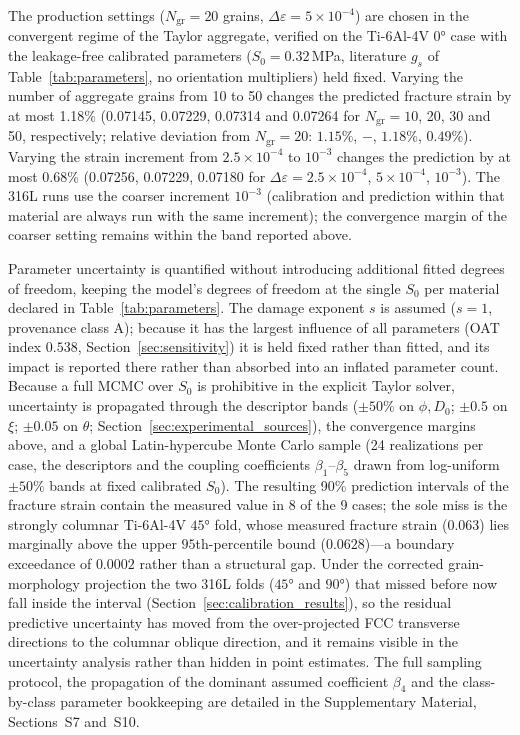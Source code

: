 \documentclass[12pt,a4paper,twocolumn]{article}
\begin{document}
The production settings ($N_{\mathrm{gr}}=20$ grains, $\Delta\varepsilon = 5\times10^{-4}$) are chosen in the convergent regime of the Taylor aggregate, verified on the Ti-6Al-4V $\ang{0}$ case with the leakage-free calibrated parameters ($S_0=0.32$\,MPa, literature $g_s$ of Table~\ref{tab:parameters}, no orientation multipliers) held fixed. Varying the number of aggregate grains from 10 to 50 changes the predicted fracture strain by at most 1.18\% (0.07145, 0.07229, 0.07314 and 0.07264 for $N_{\mathrm{gr}} = 10$, 20, 30 and 50, respectively; relative deviation from $N_{\mathrm{gr}}=20$: $1.15\%$, $-$, $1.18\%$, $0.49\%$). Varying the strain increment from $2.5\times10^{-4}$ to $10^{-3}$ changes the prediction by at most 0.68\% (0.07256, 0.07229, 0.07180 for $\Delta\varepsilon = 2.5\times10^{-4}$, $5\times10^{-4}$, $10^{-3}$). The 316L runs use the coarser increment $10^{-3}$ (calibration and prediction within that material are always run with the same increment); the convergence margin of the coarser setting remains within the band reported above.

\label{sec:uncertainty}Parameter uncertainty is quantified without introducing additional fitted degrees of freedom, keeping the model's degrees of freedom at the single $S_0$ per material declared in Table~\ref{tab:parameters}. The damage exponent $s$ is assumed ($s=1$, provenance class A); because it has the largest influence of all parameters (OAT index $0.538$, Section~\ref{sec:sensitivity}) it is held fixed rather than fitted, and its impact is reported there rather than absorbed into an inflated parameter count. Because a full MCMC over $S_0$ is prohibitive in the explicit Taylor solver, uncertainty is propagated through the descriptor bands ($\pm50\%$ on $\phi,D_0$; $\pm0.5$ on $\xi$; $\pm0.05$ on $\theta$; Section~\ref{sec:experimental_sources}), the convergence margins above, and a global Latin-hypercube Monte Carlo sample (24 realizations per case, the descriptors and the coupling coefficients $\beta_1$--$\beta_5$ drawn from log-uniform $\pm50\%$ bands at fixed calibrated $S_0$). The resulting 90\% prediction intervals of the fracture strain contain the measured value in 8 of the 9 cases; the sole miss is the strongly columnar Ti-6Al-4V $\ang{45}$ fold, whose measured fracture strain ($0.063$) lies marginally above the upper $95$th-percentile bound ($0.0628$)---a boundary exceedance of $0.0002$ rather than a structural gap. Under the corrected grain-morphology projection the two 316L folds ($\ang{45}$ and $\ang{90}$) that missed before now fall inside the interval (Section~\ref{sec:calibration_results}), so the residual predictive uncertainty has moved from the over-projected FCC transverse directions to the columnar oblique direction, and it remains visible in the uncertainty analysis rather than hidden in point estimates. The full sampling protocol, the propagation of the dominant assumed coefficient $\beta_4$ and the class-by-class parameter bookkeeping are detailed in the Supplementary Material, Sections~S7 and~S10.
\end{document}
